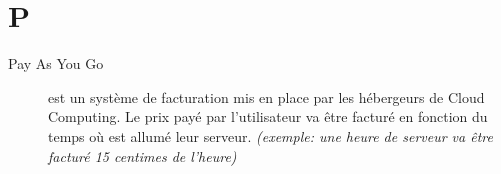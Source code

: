 \section{P}

\begin{description}

\item[Pay As You Go] est un système de facturation mis en place par les hébergeurs
de Cloud Computing. Le prix payé par l'utilisateur va être facturé en fonction du
temps où est allumé leur serveur. \textit{(exemple: une heure de serveur va être 
facturé 15 centimes de l'heure)}


\end{description}
